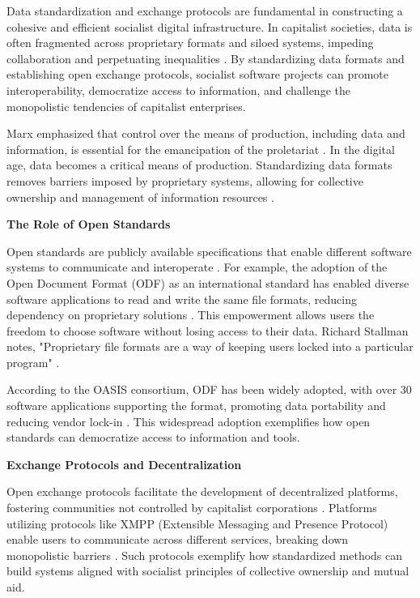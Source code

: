 \begin{refsection}
Data standardization and exchange protocols are fundamental in constructing a cohesive and efficient socialist digital infrastructure. In capitalist societies, data is often fragmented across proprietary formats and siloed systems, impeding collaboration and perpetuating inequalities \cite[pp.~45-46]{Fuchs2014}. By standardizing data formats and establishing open exchange protocols, socialist software projects can promote interoperability, democratize access to information, and challenge the monopolistic tendencies of capitalist enterprises.

Marx emphasized that control over the means of production, including data and information, is essential for the emancipation of the proletariat \cite[pp.~172-173]{Marx2008}. In the digital age, data becomes a critical means of production. Standardizing data formats removes barriers imposed by proprietary systems, allowing for collective ownership and management of information resources \cite[pp.~89-90]{Hardt2005}.

\textbf{The Role of Open Standards}

Open standards are publicly available specifications that enable different software systems to communicate and interoperate \cite[pp.~48-50]{Lessig2006}. For example, the adoption of the Open Document Format (ODF) as an international standard has enabled diverse software applications to read and write the same file formats, reducing dependency on proprietary solutions \cite[pp.~22-24]{OASIS2015}. This empowerment allows users the freedom to choose software without losing access to their data. Richard Stallman notes, "Proprietary file formats are a way of keeping users locked into a particular program" \cite[pp.~73]{Stallman2010}.

According to the OASIS consortium, ODF has been widely adopted, with over 30 software applications supporting the format, promoting data portability and reducing vendor lock-in \cite[pp.~5-7]{OASIS2015}. This widespread adoption exemplifies how open standards can democratize access to information and tools.

\textbf{Exchange Protocols and Decentralization}

Open exchange protocols facilitate the development of decentralized platforms, fostering communities not controlled by capitalist corporations \cite[pp.~5-7]{Lessig2006}. Platforms utilizing protocols like XMPP (Extensible Messaging and Presence Protocol) enable users to communicate across different services, breaking down monopolistic barriers \cite[pp.~110-112]{SaintAndre2009}. Such protocols exemplify how standardized methods can build systems aligned with socialist principles of collective ownership and mutual aid.


\end{refsection}
